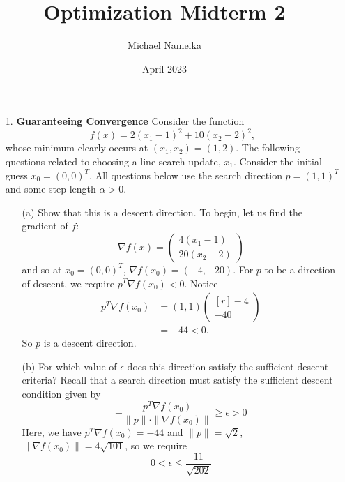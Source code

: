 \documentclass{article}
\title{Optimization Midterm 2}
\author{Michael Nameika}
\date{April 2023}
\begin{document}
\maketitle

\begin{itemize}
    \item[1.] \textbf{Guaranteeing Convergence}
    \newline\newline
    Consider the function
    \[f(x) = 2(x_1 - 1)^2 + 10(x_2 - 2)^2,\]
    whose minimum clearly occurs at $(x_1, x_2) = (1,2)$. 
    \newline
    The following questions related to choosing a line search update, $x_1$. Consider the initial guess $x_0 = (0,0)^T$. All questions below use the search direction $p = (1,1)^T$ and some step length $\alpha > 0$. 
    \begin{itemize}
        \item[(a)] Show that this is a descent direction.
        \newline\newline
        To begin, let us find the gradient of $f$:
        \[\nabla f(x) = \begin{pmatrix}
            4(x_1 - 1)\\
            20(x_2 - 2)
        \end{pmatrix}\]
        and so at $x_0 = (0,0)^T$, $\nabla f(x_0) = (-4, -20)$. For $p$ to be a direction of descent, we require $p^T\nabla f(x_0) < 0$. Notice
        \begin{align*}
            p^T\nabla f(x_0) &= (1,1)\begin{pmatrix*}[r]
                -4\\
                -40
            \end{pmatrix*}\\
            &= -44 < 0.
        \end{align*}
        So $p$ is a descent direction.
        
        \item[(b)] For which value of $\epsilon$ does this direction satisfy the sufficient descent criteria?
        \newline\newline
        Recall that a search direction must satisfy the sufficient descent condition given by
        \[-\frac{p^T\nabla f(x_0)}{\|p\| \cdot \|\nabla f(x_0)\|} \geq \epsilon > 0\]
        Here, we have $p^T\nabla f(x_0) = -44$ and $\|p\| = \sqrt{2}$, $\|\nabla f(x_0)\| = 4\sqrt{101}$, so we require
        \[0 < \epsilon \leq \frac{11}{\sqrt{202}}\]


\end{itemize}
\end{itemize}
\end{document}
